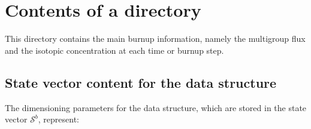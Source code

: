 \section{Contents of a 
 directory}\label{sect:burnupdir}

This directory contains the main burnup information, namely  the multigroup flux and the
isotopic concentration at each time or burnup step.

\subsection{State vector content for the  data structure}\label{sect:burnupstate}

The dimensioning parameters for the  data structure, which are stored in
the state vector $\mathcal{S}^{b}$, represent:

